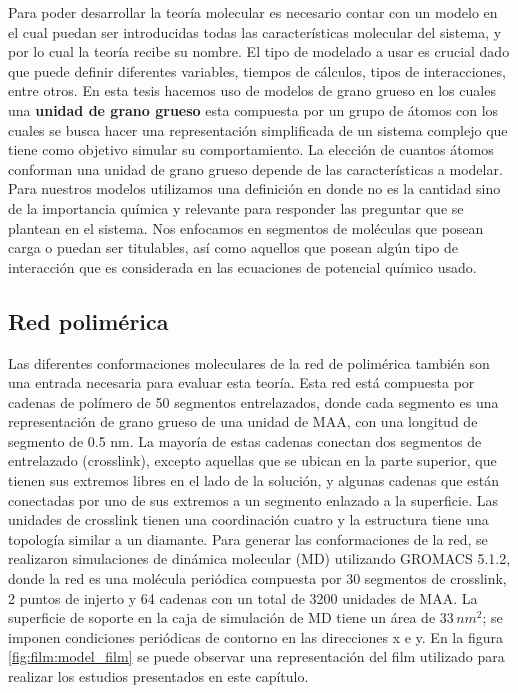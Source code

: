 Para poder desarrollar la teor\'ia molecular es necesario contar con un modelo en el cual puedan ser introducidas todas las caracter\'isticas molecular del sistema, y por lo cual la teor\'ia recibe su nombre.
El tipo de modelado a usar es crucial dado que puede definir diferentes variables, tiempos de c\'alculos, tipos de interacciones, entre otros. 
En esta tesis hacemos uso de modelos de grano grueso en los cuales una \textbf{unidad de grano grueso} esta compuesta por un grupo de \'atomos con los cuales  se busca hacer una representaci\'on simplificada de un sistema complejo que tiene como objetivo simular su comportamiento.
La elecci\'on de cuantos \'atomos conforman una unidad de grano grueso depende de las caracter\'isticas a modelar. 
Para nuestros modelos utilizamos una definici\'on en donde no es la cantidad sino de la importancia qu\'imica y relevante para responder las preguntar que se plantean en el sistema. Nos enfocamos en segmentos de mol\'eculas que posean carga o puedan ser titulables, as\'i como aquellos que posean alg\'un tipo de interacci\'on que es considerada en las ecuaciones de potencial qu\'imico usado.



\subsection{Red polim\'erica}

Las diferentes conformaciones moleculares de la red de polim\'erica tambi\'en son una entrada necesaria para evaluar esta teor\'ia. Esta red est\'a compuesta por cadenas de pol\'imero de 50 segmentos entrelazados, donde cada segmento es una representaci\'on de grano grueso de una unidad de MAA, con una longitud de segmento de 0.5 nm. La mayor\'ia de estas cadenas conectan dos segmentos de entrelazado (crosslink), excepto aquellas que se ubican en la parte superior, que tienen sus extremos libres en el lado de la soluci\'on, y algunas cadenas que est\'an conectadas por uno de sus extremos a un segmento enlazado a la superficie. Las unidades de crosslink tienen una coordinaci\'on cuatro y la estructura tiene una topolog\'ia similar a un diamante. Para generar las conformaciones de la red, se realizaron simulaciones de din\'amica molecular (MD) utilizando GROMACS 5.1.2, donde la red es una mol\'ecula peri\'odica compuesta por 30 segmentos de crosslink, 2 puntos de injerto y 64 cadenas con un total de 3200 unidades de MAA. La superficie de soporte en la caja de simulaci\'on de MD tiene un \'area de $33\, nm^2$; se imponen condiciones peri\'odicas de contorno en las direcciones x e y. 
En la figura \ref{fig:film:model_film} se puede observar una representaci\'on del film utilizado para realizar los estudios presentados en este cap\'itulo.


